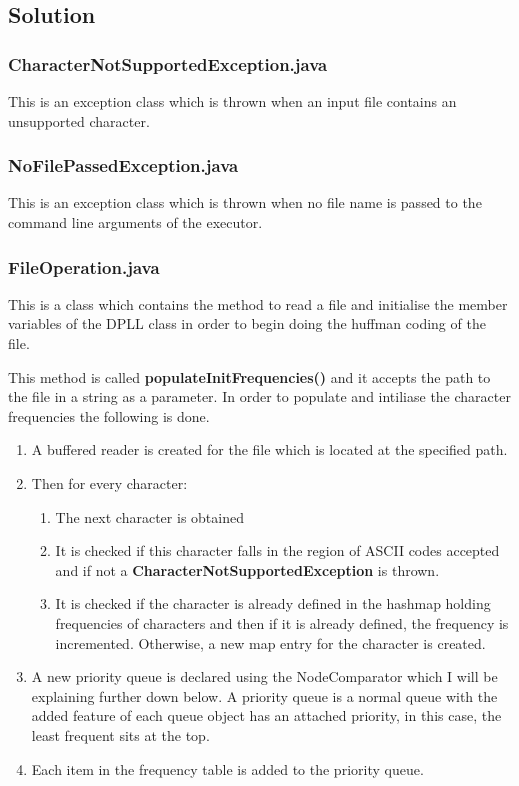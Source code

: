 \documentclass{article}
\begin{document}
		\subsection{Solution}
		
		\subsubsection{CharacterNotSupportedException.java}
		
		This is an exception class which is thrown when an input file contains an unsupported character.
		
		\subsubsection{NoFilePassedException.java}
		
		This is an exception class which is thrown when no file name is passed to the command line arguments of the executor.
		
		
		\subsubsection{FileOperation.java}
		
		This is a class which contains the method to read a file and initialise the member variables of the DPLL class in order to begin doing the huffman coding of the file.
		
		This method is called \textbf{populateInitFrequencies()} and it accepts the path to the file in a string as a parameter. In order to populate and intiliase the character frequencies the following is done.
		
		\begin{enumerate}
			\item A buffered reader is created for the file which is located at  the specified path.
			\item Then for every character:
				\begin{enumerate}
					\item The next character is obtained
					\item It is checked if this character falls in the region of ASCII codes accepted and if not a \textbf{CharacterNotSupportedException} is thrown.
					\item It is checked if the character is already defined in the hashmap holding frequencies of characters and then if it is already defined, the frequency is incremented. Otherwise, a new map entry for the character is created.
				\end{enumerate}
\item A new priority queue is declared using the NodeComparator which I will be explaining further down below. A priority queue is a normal queue with the added feature of each queue object has an attached priority, in this case, the least frequent sits at the top. 
\item Each item in the frequency table is added to the priority queue.
		\end{enumerate}
		
\end{document}
